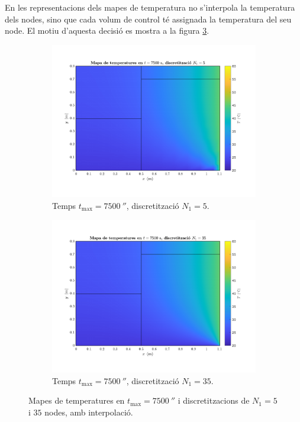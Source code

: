 En les representacions dels mapes de temperatura no s'interpola la temperatura dels nodes, sino que cada volum de control té assignada la temperatura del seu node. El motiu d'aquesta decisió es mostra a la figura \ref{fig:malla_comparacio}.
\begin{figure}[ht]
	\centering
	\begin{subfigure}{.5\textwidth}
		\centering
		\includegraphics[width=.95\linewidth]{imagenes/04_influencia/malla/malla_31.pdf}
		\vspace{-15pt}
		\caption{Temps $t_\text{max} = 7500 \ \second$, discretització $N_1 = 5$.}
		\label{fig:malla_31}
	\end{subfigure}%
	\begin{subfigure}{.5\textwidth}
		\centering
		\includegraphics[width=.95\linewidth]{imagenes/04_influencia/malla/malla_34.pdf}
		\vspace{-15pt}
		\caption{Temps $t_\text{max} = 7500 \ \second$, discretització $N_1 = 35$.}
		\label{fig:malla_34}
	\end{subfigure}
	\caption{Mapes de temperatures en $t_\text{max} = 7500 \ \second$ i discretitzacions de $N_1 = 5$ i $35$ nodes, amb interpolació.}
	\label{fig:malla_comparacio}
\end{figure} 

